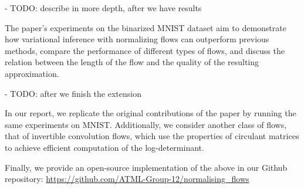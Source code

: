 

- TODO: describe in more depth, after we have results

The paper’s experiments on the binarized MNIST dataset aim to demonstrate how variational inference with normalizing flows can outperform previous methods, compare the performance of different types of flows, and discuss the relation between the length of the flow and the quality of the resulting approximation.

- TODO: after we finish the extension

In our report, we replicate the original contributions of the paper by running the same experiments on MNIST. Additionally, we consider another class of flows, that of invertible convolution flows, which use the properties of circulant matrices to achieve efficient computation of the log-determinant. 

Finally, we provide an open-source implementation of the above in our Github repository: 
\url{https://github.com/ATML-Group-12/normalising_flows}

